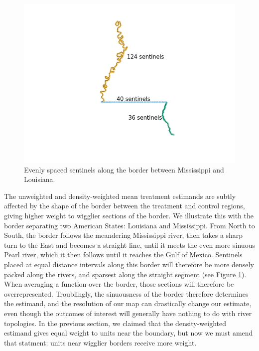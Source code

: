 \documentclass[letter]{article}
\makeatletter
\def\maxwidth{\ifdim\Gin@nat@width>\linewidth\linewidth
\else\Gin@nat@width\fi}
\let\Oldincludegraphics\includegraphics
\renewcommand{\includegraphics}[1]{\Oldincludegraphics[width=.8\maxwidth]{#1}}
\makeatother
\begin{document}
\begin{figure}
\centering
\includegraphics{figures/mississippi_counts.png}
\caption{\label{fig:mississippi_counts} Evenly spaced sentinels along the border between Mississippi and Louisiana.}
\end{figure}

The unweighted and density-weighted mean treatment estimands are subtly affected by the shape of the border between the treatment and control regions,
giving higher weight to wigglier sections of the border.
We illustrate this with the border separating two American States: Louisiana and Mississippi.
From North to South, the border follows the meandering Mississippi river, then takes a sharp turn to the East and becomes a straight line, until it meets the even more sinuous Pearl river, which it then follows until it reaches the Gulf of Mexico.
Sentinels placed at equal distance intervals along this border will therefore be more densely packed along the rivers, and sparsest along the straight segment (see Figure \ref{fig:mississippi_counts}).
When averaging a function over the border, those sections will therefore be overrepresented.
Troublingly, the sinuousness of the border therefore determines the estimand,
and the resolution of our map can drastically change our estimate,
even though the outcomes of interest will generally have nothing to do with river topologies.
In the previous section, we claimed that the density-weighted estimand gives equal weight to units near the boundary, but now we must amend that statment: units near wigglier borders receive more weight.
\end{document}
